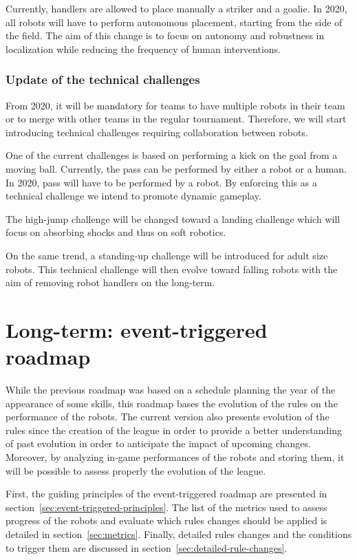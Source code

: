 \documentclass{article}
\begin{document}
Currently, handlers are allowed to place manually a striker and a goalie.
In 2020, all robots will have to perform autonomous placement,
starting from the side of the field.
The aim of this change is to focus on autonomy and robustness in localization
while reducing the frequency of human interventions.

\subsubsection{Update of the technical challenges}

From 2020, it will be mandatory for teams to have multiple robots in their team
or to merge with other teams in the regular tournament.
Therefore, we will start introducing technical challenges requiring collaboration between robots.

One of the current challenges is based on performing a kick on the goal from a moving ball.
Currently, the pass can be performed by either a robot or a human.
In 2020, pass will have to be performed by a robot.
By enforcing this as a technical challenge we intend to promote dynamic gameplay.

The high-jump challenge will be changed toward a landing challenge which will
focus on absorbing shocks and thus on soft robotics.

On the same trend, a standing-up challenge will be introduced for adult size robots.
This technical challenge will then evolve toward falling robots with the aim of removing
robot handlers on the long-term.


\section{\label{sec:LongTerm}Long-term: event-triggered roadmap}

While the previous roadmap was based on a schedule planning the year of the 
appearance of some skills,
this roadmap bases the evolution of the rules on the performance of the robots.
The current version also presents evolution of the rules since the creation of
the league in order to provide a better understanding of past evolution in order
to anticipate the impact of upcoming changes.
Moreover, by analyzing in-game performances of the robots and storing them,
it will be possible to assess properly the evolution of the league.

First, the guiding principles of the event-triggered roadmap are presented in
section~\ref{sec:event-triggered-principles}.
The list of the metrics used to assess progress of the robots and evaluate which
rules changes should be applied is detailed in section~\ref{sec:metrics}.
Finally, detailed rules changes and the conditions to trigger them are discussed
in section~\ref{sec:detailed-rule-changes}.
\end{document}
